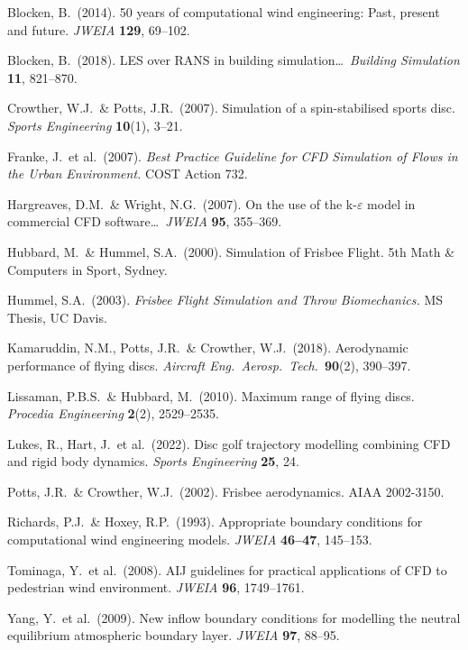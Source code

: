 \documentclass[11pt,letterpaper]{article}
\begin{document}
\begin{description}[font=\normalfont\itshape,leftmargin=1em]
  \item Blocken, B.\ (2014). 50 years of computational wind engineering: Past, present and future. \emph{JWEIA} \textbf{129}, 69--102.
  \item Blocken, B.\ (2018). LES over RANS in building simulation\ldots\ \emph{Building Simulation} \textbf{11}, 821--870.
  \item Crowther, W.J.\ \& Potts, J.R.\ (2007). Simulation of a spin-stabilised sports disc. \emph{Sports Engineering} \textbf{10}(1), 3--21.
  \item Franke, J.\ et al.\ (2007). \emph{Best Practice Guideline for CFD Simulation of Flows in the Urban Environment.} COST Action 732.
  \item Hargreaves, D.M.\ \& Wright, N.G.\ (2007). On the use of the k-$\varepsilon$ model in commercial CFD software\ldots\ \emph{JWEIA} \textbf{95}, 355--369.
  \item Hubbard, M.\ \& Hummel, S.A.\ (2000). Simulation of Frisbee Flight. 5th Math \& Computers in Sport, Sydney.
  \item Hummel, S.A.\ (2003). \emph{Frisbee Flight Simulation and Throw Biomechanics.} MS Thesis, UC Davis.
  \item Kamaruddin, N.M., Potts, J.R.\ \& Crowther, W.J.\ (2018). Aerodynamic performance of flying discs. \emph{Aircraft Eng.\ Aerosp.\ Tech.}\ \textbf{90}(2), 390--397.
  \item Lissaman, P.B.S.\ \& Hubbard, M.\ (2010). Maximum range of flying discs. \emph{Procedia Engineering} \textbf{2}(2), 2529--2535.
  \item Lukes, R., Hart, J.\ et al.\ (2022). Disc golf trajectory modelling combining CFD and rigid body dynamics. \emph{Sports Engineering} \textbf{25}, 24.
  \item Potts, J.R.\ \& Crowther, W.J.\ (2002). Frisbee\texttrademark{} aerodynamics. AIAA 2002-3150.
  \item Richards, P.J.\ \& Hoxey, R.P.\ (1993). Appropriate boundary conditions for computational wind engineering models. \emph{JWEIA} \textbf{46--47}, 145--153.
  \item Tominaga, Y.\ et al.\ (2008). AIJ guidelines for practical applications of CFD to pedestrian wind environment. \emph{JWEIA} \textbf{96}, 1749--1761.
  \item Yang, Y.\ et al.\ (2009). New inflow boundary conditions for modelling the neutral equilibrium atmospheric boundary layer. \emph{JWEIA} \textbf{97}, 88--95.

\end{description}
\end{document}
